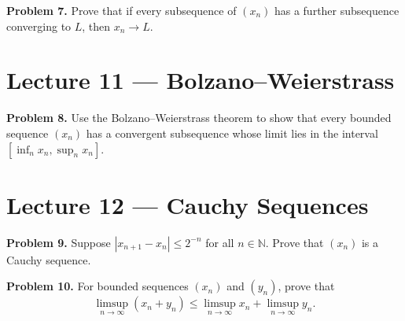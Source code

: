 \documentclass[11pt]{article}
\begin{document}
\noindent\textbf{Problem 7.} Prove that if every subsequence of $(x_n)$ has a further subsequence converging to $L$, then $x_n \to L$.

\section*{Lecture 11 --- Bolzano--Weierstrass}

\noindent\textbf{Problem 8.} Use the Bolzano--Weierstrass theorem to show that every bounded sequence $(x_n)$ has a convergent subsequence whose limit lies in the interval $[\inf_n x_n, \sup_n x_n]$.

\section*{Lecture 12 --- Cauchy Sequences}

\noindent\textbf{Problem 9.} Suppose $|x_{n+1} - x_n| \le 2^{-n}$ for all $n \in \mathbb{N}$. Prove that $(x_n)$ is a Cauchy sequence.

\noindent\textbf{Problem 10.} For bounded sequences $(x_n)$ and $(y_n)$, prove that
\[
  \limsup_{n\to\infty} (x_n + y_n) \le \limsup_{n\to\infty} x_n + \limsup_{n\to\infty} y_n.
\]
\end{document}
